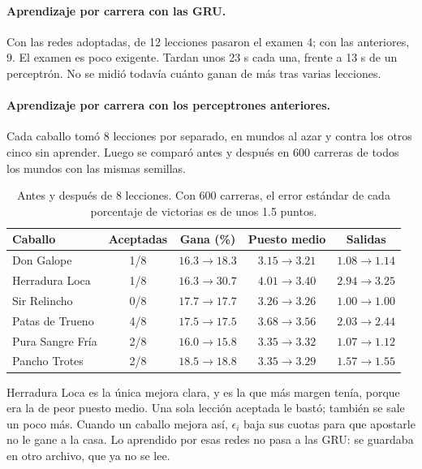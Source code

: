 \documentclass[11pt,letterpaper]{article}
\begin{document}
\paragraph{Aprendizaje por carrera con las GRU.} Con las redes adoptadas, de 12 lecciones pasaron el examen 4; con las anteriores, 9. El examen es poco exigente. Tardan unos 23 s cada una, frente a 13 s de un perceptrón. No se midió todavía cuánto ganan de más tras varias lecciones.

\paragraph{Aprendizaje por carrera con los perceptrones anteriores.} Cada caballo tomó 8 lecciones por separado, en mundos al azar y contra los otros cinco sin aprender. Luego se comparó antes y después en 600 carreras de todos los mundos con las mismas semillas.

\begin{table}[h]
\centering
\begin{tabular}{lcccc}
\toprule
Caballo & Aceptadas & Gana (\%) & Puesto medio & Salidas \\
\midrule
Don Galope & 1/8 & $16.3 \to 18.3$ & $3.15 \to 3.21$ & $1.08 \to 1.14$ \\
Herradura Loca & 1/8 & $16.3 \to 30.7$ & $4.01 \to 3.40$ & $2.94 \to 3.25$ \\
Sir Relincho & 0/8 & $17.7 \to 17.7$ & $3.26 \to 3.26$ & $1.00 \to 1.00$ \\
Patas de Trueno & 4/8 & $17.5 \to 17.5$ & $3.68 \to 3.56$ & $2.03 \to 2.44$ \\
Pura Sangre Fría & 2/8 & $16.0 \to 15.8$ & $3.35 \to 3.32$ & $1.07 \to 1.12$ \\
Pancho Trotes & 2/8 & $18.5 \to 18.8$ & $3.35 \to 3.29$ & $1.57 \to 1.55$ \\
\bottomrule
\end{tabular}
\caption{Antes y después de 8 lecciones. Con 600 carreras, el error estándar de cada porcentaje de victorias es de unos 1.5 puntos.}
\label{tab:lecciones}
\end{table}

Herradura Loca es la única mejora clara, y es la que más margen tenía, porque era la de peor puesto medio. Una sola lección aceptada le bastó; también se sale un poco más. Cuando un caballo mejora así, $\epsilon_i$ baja sus cuotas para que apostarle no le gane a la casa. Lo aprendido por esas redes no pasa a las GRU: se guardaba en otro archivo, que ya no se lee.
\end{document}
